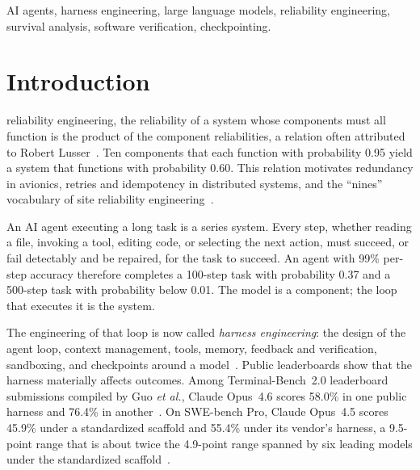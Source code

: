 \documentclass[journal]{IEEEtran}
\begin{document}
\begin{IEEEkeywords}
AI agents, harness engineering, large language models, reliability engineering, survival analysis, software verification, checkpointing.
\end{IEEEkeywords}

\section{Introduction}\label{sec:intro}
 reliability engineering, the reliability of a system whose components must all function is the product of the component reliabilities, a relation often attributed to Robert Lusser~\cite{oconnor2012}. Ten components that each function with probability 0.95 yield a system that functions with probability 0.60. This relation motivates redundancy in avionics, retries and idempotency in distributed systems, and the ``nines'' vocabulary of site reliability engineering~\cite{beyer2016}.

An AI agent executing a long task is a series system. Every step, whether reading a file, invoking a tool, editing code, or selecting the next action, must succeed, or fail detectably and be repaired, for the task to succeed. An agent with 99\% per-step accuracy therefore completes a 100-step task with probability 0.37 and a 500-step task with probability below 0.01. The model is a component; the loop that executes it is the system.

The engineering of that loop is now called \emph{harness engineering}: the design of the agent loop, context management, tools, memory, feedback and verification, sandboxing, and checkpoints around a model~\cite{lopopolo2026,bockeler2026}. Public leaderboards show that the harness materially affects outcomes. Among Terminal-Bench~2.0 leaderboard submissions compiled by Guo \emph{et al.}, Claude Opus~4.6 scores 58.0\% in one public harness and 76.4\% in another~\cite{guo2026survey}. On SWE-bench Pro, Claude Opus~4.5 scores 45.9\% under a standardized scaffold and 55.4\% under its vendor's harness, a 9.5-point range that is about twice the 4.9-point range spanned by six leading models under the standardized scaffold~\cite{zhang2026disclose}.
\end{document}
